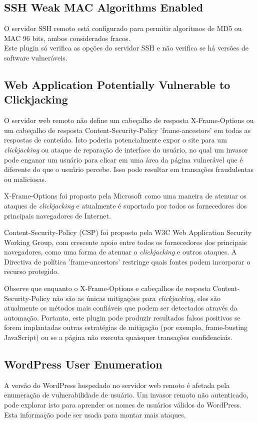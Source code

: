 \documentclass[
	12pt,				%
	openright,			%
	twoside,			%
	a4paper,			%
	english,			%
	french,				%
	spanish,			%
	brazil				%
	]{abntex2}
\begin{document}
\subsection{SSH Weak MAC Algorithms Enabled}
O servidor SSH remoto está configurado para permitir algoritmos de  MD5 ou MAC 96 bits, ambos considerados fracos.
\\
Este plugin só verifica as opções do servidor SSH e não verifica se há versões de software vulneráveis.

\subsection{Web Application Potentially Vulnerable to Clickjacking}
O servidor web remoto não define um cabeçalho de resposta X-Frame-Options ou um cabeçalho de resposta Content-Security-Policy 'frame-ancestors'  em todas as respostas de conteúdo. Isto poderia potencialmente expor o site para um \textit{clickjacking} ou ataque de reparação de interface do usuário, no qual um invasor pode enganar um usuário para clicar em uma área da página vulnerável que é diferente do que o usuário percebe. Isso pode resultar em transações fraudulentas ou maliciosas.

X-Frame-Options foi proposto pela Microsoft como uma maneira de atenuar os ataques de \textit{clickjacking} e atualmente é suportado por todos os fornecedores dos principais navegadores de Internet.

Content-Security-Policy (CSP) foi proposto pela W3C Web Application Security Working Group, com crescente apoio entre todos os fornecedores dos principais navegadores, como uma forma de atenuar o \textit{clickjacking} e outros ataques. A Directiva de política 'frame-ancestors' restringe quais fontes podem incorporar o recurso protegido.

Observe que enquanto o X-Frame-Options e cabeçalhos de resposta Content-Security-Policy não são as únicas mitigações para \textit{clickjacking}, eles são atualmente os métodos mais confiáveis que podem ser detectados através da automação. Portanto, este plugin pode produzir resultados falsos positivos se forem implantadas outras estratégias de mitigação (por exemplo, frame-busting JavaScript) ou se a página não executa quaisquer transações confidenciais.

\subsection{WordPress User Enumeration}
A versão do WordPress hospedado no servidor web remoto é afetada pela enumeração de vulnerabilidade de usuário. Um invasor remoto não autenticado, pode explorar isto para aprender os nomes de usuários válidos do WordPress. 
\\Esta informação pode ser usada para montar mais ataques.
\end{document}
